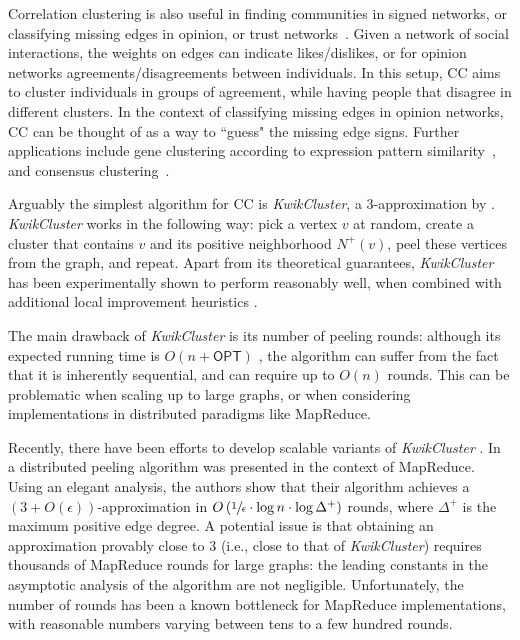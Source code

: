\documentclass{article} %
\begin{document}
Correlation clustering is also useful in finding communities in signed networks, or classifying missing edges in opinion, or trust networks~\cite{yang2007community,cesa2012correlation}. 
Given a network of social interactions, the weights on edges can indicate likes/dislikes, or for opinion networks agreements/disagreements between individuals.
In this setup, CC aims to cluster individuals in groups of agreement, while having people that disagree in different clusters. 
In the context of classifying missing edges in opinion networks, CC can be thought of as a way to ``guess" the missing edge signs.
Further applications include gene clustering according to expression pattern similarity~\cite{ben1999clustering}, and consensus clustering~\cite{elsner2009bounding}.


Arguably the simplest algorithm for CC is {\it{KwikCluster}}, a 3-approximation by \cite{ailon2008aggregating}.
{\it{KwikCluster}}  works in the following way: pick a vertex $v$ at random, create a cluster that contains $v$ and its positive neighborhood $N^+(v)$, peel these vertices from the graph, and repeat. 
Apart from its theoretical guarantees, {\it{KwikCluster}} has been experimentally shown to perform reasonably well, when combined with additional local improvement heuristics \cite{elsner2009bounding}.

The main drawback of {\it{KwikCluster}} is its number of peeling rounds: 
although its expected running time is $O(n+\mathsf{OPT})$ \cite{ailon2009correlation}, the algorithm can suffer from the fact that it is inherently sequential, and can require up to $O(n)$ rounds.
This can be problematic when scaling up to large graphs, or when considering implementations in distributed paradigms like MapReduce.

Recently, there have been efforts to develop scalable variants of {\it{KwikCluster}} \cite{bonchi2014correlation,
chierichetti2014correlation}.
In \cite{chierichetti2014correlation} a distributed peeling algorithm was presented in the context of MapReduce.
Using an elegant analysis, the authors show that their algorithm achieves a $(3+O(\epsilon))$-approximation in $O\left(\sfrac{1}{\epsilon} \cdot\log n \cdot \log \Delta^+\right)$ rounds, where $\Delta^+$ is the maximum positive edge degree.
A potential issue is that obtaining an approximation provably close to $3$ (i.e., close to that of {\it{KwikCluster}}) requires thousands of MapReduce rounds for large graphs: the leading constants in the asymptotic analysis of the algorithm are not negligible.
Unfortunately, the number of rounds has been a known bottleneck for MapReduce implementations, with reasonable numbers varying between tens to a few hundred rounds.
\end{document}
